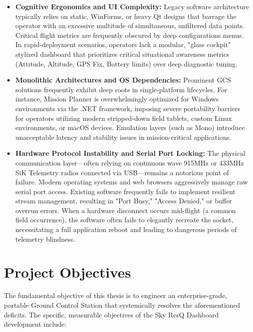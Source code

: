 \begin{itemize}
    \item \textbf{Cognitive Ergonomics and UI Complexity:} Legacy software architecture typically relies on static, WinForms, or heavy Qt designs that barrage the operator with an excessive multitude of simultaneous, unfiltered data points. Critical flight metrics are frequently obscured by deep configurations menus. In rapid-deployment scenarios, operators lack a modular, "glass cockpit" stylized dashboard that prioritizes critical situational awareness metrics (Attitude, Altitude, GPS Fix, Battery limits) over deep diagnostic tuning.
    
    \item \textbf{Monolithic Architectures and OS Dependencies:} Prominent GCS solutions frequently exhibit deep roots in single-platform lifecycles. For instance, Mission Planner is overwhelmingly optimized for Windows environments via the .NET framework, imposing severe portability barriers for operators utilizing modern stripped-down field tablets, custom Linux environments, or macOS devices. Emulation layers (such as Mono) introduce unacceptable latency and stability issues in mission-critical applications.
    
    \item \textbf{Hardware Protocol Instability and Serial Port Locking:} The physical communication layer—often relying on continuous wave 915MHz or 433MHz SiK Telemetry radios connected via USB—remains a notorious point of failure. Modern operating systems and web browsers aggressively manage raw serial port access. Existing software frequently fails to implement resilient stream management, resulting in "Port Busy," "Access Denied," or buffer overrun errors. When a hardware disconnect occurs mid-flight (a common field occurrence), the software often fails to elegantly recreate the socket, necessitating a full application reboot and leading to dangerous periods of telemetry blindness.
\end{itemize}

\section{Project Objectives}
The fundamental objective of this thesis is to engineer an enterprise-grade, portable Ground Control Station that systemically resolves the aforementioned deficits. The specific, measurable objectives of the Sky ResQ Dashboard development include:

